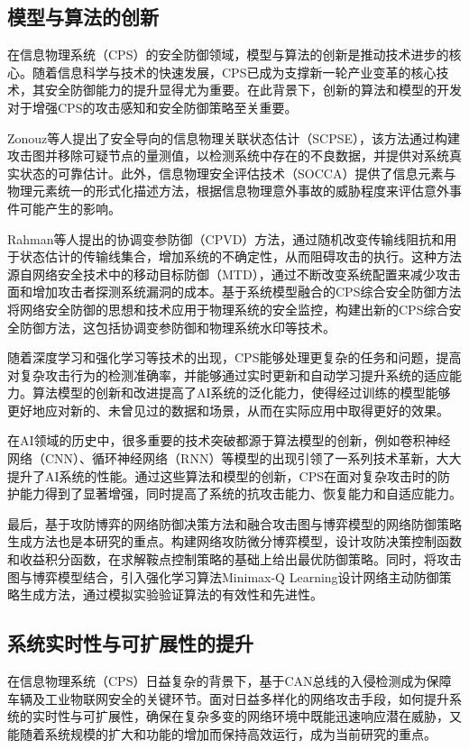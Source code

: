\subsection{模型与算法的创新}

在信息物理系统（CPS）的安全防御领域，模型与算法的创新是推动技术进步的核心。随着信息科学与技术的快速发展，CPS已成为支撑新一轮产业变革的核心技术，其安全防御能力的提升显得尤为重要。在此背景下，创新的算法和模型的开发对于增强CPS的攻击感知和安全防御策略至关重要。

Zonouz等人提出了安全导向的信息物理关联状态估计（SCPSE），该方法通过构建攻击图并移除可疑节点的量测值，以检测系统中存在的不良数据，并提供对系统真实状态的可靠估计。此外，信息物理安全评估技术（SOCCA）提供了信息元素与物理元素统一的形式化描述方法，根据信息物理意外事故的威胁程度来评估意外事件可能产生的影响。

Rahman等人提出的协调变参防御（CPVD）方法，通过随机改变传输线阻抗和用于状态估计的传输线集合，增加系统的不确定性，从而阻碍攻击的执行。这种方法源自网络安全技术中的移动目标防御（MTD），通过不断改变系统配置来减少攻击面和增加攻击者探测系统漏洞的成本。基于系统模型融合的CPS综合安全防御方法将网络安全防御的思想和技术应用于物理系统的安全监控，构建出新的CPS综合安全防御方法，这包括协调变参防御和物理系统水印等技术。

随着深度学习和强化学习等技术的出现，CPS能够处理更复杂的任务和问题，提高对复杂攻击行为的检测准确率，并能够通过实时更新和自动学习提升系统的适应能力。算法模型的创新和改进提高了AI系统的泛化能力，使得经过训练的模型能够更好地应对新的、未曾见过的数据和场景，从而在实际应用中取得更好的效果。

在AI领域的历史中，很多重要的技术突破都源于算法模型的创新，例如卷积神经网络（CNN）、循环神经网络（RNN）等模型的出现引领了一系列技术革新，大大提升了AI系统的性能。通过这些算法和模型的创新，CPS在面对复杂攻击时的防护能力得到了显著增强，同时提高了系统的抗攻击能力、恢复能力和自适应能力。

最后，基于攻防博弈的网络防御决策方法和融合攻击图与博弈模型的网络防御策略生成方法也是本研究的重点。构建网络攻防微分博弈模型，设计攻防决策控制函数和收益积分函数，在求解鞍点控制策略的基础上给出最优防御策略。同时，将攻击图与博弈模型结合，引入强化学习算法Minimax-Q Learning设计网络主动防御策略生成方法，通过模拟实验验证算法的有效性和先进性。


\subsection{系统实时性与可扩展性的提升}

在信息物理系统（CPS）日益复杂的背景下，基于CAN总线的入侵检测成为保障车辆及工业物联网安全的关键环节。面对日益多样化的网络攻击手段，如何提升系统的实时性与可扩展性，确保在复杂多变的网络环境中既能迅速响应潜在威胁，又能随着系统规模的扩大和功能的增加而保持高效运行，成为当前研究的重点。


